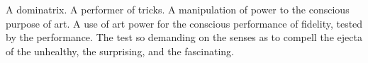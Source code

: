 

A dominatrix.  A performer of tricks.  A manipulation of power to the
conscious purpose of art.  A use of art power for the conscious
performance of fidelity, tested by the performance.  The test so
demanding on the senses as to compell the ejecta of the unhealthy, the
surprising, and the fascinating.

\bye
